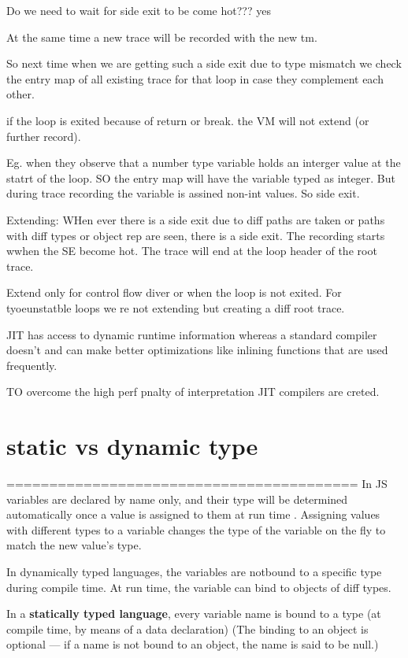 Do we need to wait for side exit to be come hot???  yes

At the same time a new trace will be recorded with the 
new tm. 

So next time when we are getting such a side exit due to type mismatch
we check the entry map of all existing trace for that loop in case they complement each other.


if the loop is exited because of return or break. the VM will not extend (or further record).

Eg. when they observe that a number type variable holds an interger value at the statrt of 
the loop. SO the entry map will have the variable typed as integer.
But during trace recording the variable is assined non-int values. So
side exit.

Extending:
WHen ever there is a side exit due to diff paths are taken or paths with diff types or object rep 
are seen, there is a side exit. The recording starts wwhen the SE become hot.
The trace will end at the loop header of the root trace.

Extend only for control flow diver or when the loop is not exited.
For tyoeunstatble loops we re not extending but creating a diff root trace.


JIT has access to dynamic runtime information whereas
a standard compiler doesn't and can make better optimizations like inlining
functions that are used frequently.

TO overcome the high perf pnalty of interpretation JIT compilers are creted.

\section{static vs dynamic type}
=========================================
In JS variables are declared by name only, and their type will be determined
automatically once a value is assigned to them at run time . Assigning values with different
types to a variable changes the type of the variable on the fly to match the
new value’s type. 


In dynamically typed languages, the variables are notbound to a specific 
type during compile time. At run time, the variable can bind to objects of
diff types.


In a \textbf{statically typed language}, every variable name is bound 
to a type (at compile time, by means of a data declaration)
(The binding to an object is optional — if a name is not bound to an object, the name is said to be null.)

